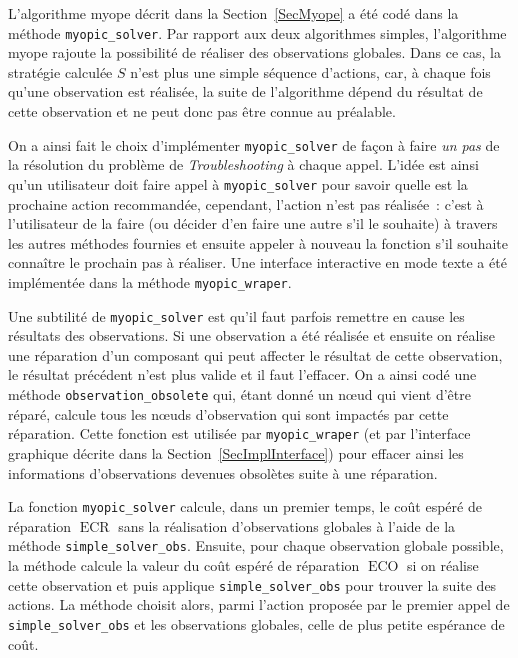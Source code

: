 \documentclass[a4paper,11pt]{article}
\theoremstyle{plain}
\theoremstyle{definition}
\DeclareMathOperator{\ECO}{ECO}
\DeclareMathOperator{\ECR}{ECR}
\begin{document}
L'algorithme myope décrit dans la Section~\ref{SecMyope} a été codé dans la méthode \texttt{myopic\_solver}. Par rapport aux deux algorithmes simples, l'algorithme myope rajoute la possibilité de réaliser des observations globales. Dans ce cas, la stratégie calculée $S$ n'est plus une simple séquence d'actions, car, à chaque fois qu'une observation est réalisée, la suite de l'algorithme dépend du résultat de cette observation et ne peut donc pas être connue au préalable.

On a ainsi fait le choix d'implémenter \texttt{myopic\_solver} de façon à faire \emph{un pas} de la résolution du problème de \emph{Troubleshooting} à chaque appel. L'idée est ainsi qu'un utilisateur doit faire appel à \texttt{myopic\_solver} pour savoir quelle est la prochaine action recommandée, cependant, l'action n'est pas réalisée~: c'est à l'utilisateur de la faire (ou décider d'en faire une autre s'il le souhaite) à travers les autres méthodes fournies et ensuite appeler à nouveau la fonction s'il souhaite connaître le prochain pas à réaliser. Une interface interactive en mode texte a été implémentée dans la méthode \texttt{myopic\_wraper}.

Une subtilité de \texttt{myopic\_solver} est qu'il faut parfois remettre en cause les résultats des observations. Si une observation a été réalisée et ensuite on réalise une réparation d'un composant qui peut affecter le résultat de cette observation, le résultat précédent n'est plus valide et il faut l'effacer. On a ainsi codé une méthode \texttt{observation\_obsolete} qui, étant donné un nœud qui vient d'être réparé, calcule tous les nœuds d'observation qui sont impactés par cette réparation. Cette fonction est utilisée par \texttt{myopic\_wraper} (et par l'interface graphique décrite dans la Section~\ref{SecImplInterface}) pour effacer ainsi les informations d'observations devenues obsolètes suite à une réparation.

La fonction \texttt{myopic\_solver} calcule, dans un premier temps, le coût espéré de réparation $\ECR$ sans la réalisation d'observations globales à l'aide de la méthode \texttt{simple\_solver\_obs}. Ensuite, pour chaque observation globale possible, la méthode calcule la valeur du coût espéré de réparation $\ECO$ si on réalise cette observation et puis applique \texttt{simple\_solver\_obs} pour trouver la suite des actions. La méthode choisit alors, parmi l'action proposée par le premier appel de \texttt{simple\_solver\_obs} et les observations globales, celle de plus petite espérance de coût.
\end{document}
